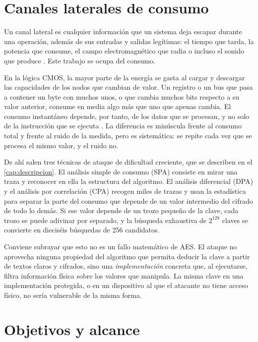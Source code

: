 \section{Canales laterales de consumo}
\label{sec:canales-laterales}

Un canal lateral es cualquier información que un sistema deja escapar durante
una operación, además de sus entradas y salidas legítimas: el tiempo que tarda,
la potencia que consume, el campo electromagnético que radia o incluso el sonido
que produce \cite[sec.~II.B]{mishra2025modern}. Este trabajo se ocupa del
consumo.

En la lógica CMOS, la mayor parte de la energía se gasta al cargar y descargar
las capacidades de los nodos que cambian de valor. Un registro o un bus que pasa
a contener un byte con muchos unos, o que cambia muchos bits respecto a su valor
anterior, consume en media algo más que uno que apenas cambia. El consumo
instantáneo depende, por tanto, de los datos que se procesan, y no solo de la
instrucción que se ejecuta \cite{mangard2007power,kocher2011intro}. La
diferencia es minúscula frente al consumo total y frente al ruido de la medida,
pero es sistemática: se repite cada vez que se procesa el mismo valor, y el
ruido no.

De ahí salen tres técnicas de ataque de dificultad creciente, que se describen
en el \cref{cap:descripcion}. El análisis simple de consumo (SPA) consiste en
mirar una traza y reconocer en ella la estructura del algoritmo. El análisis
diferencial (DPA) \cite{kocher1999dpa} y el análisis por correlación (CPA)
\cite{brier2004cpa} recogen miles de trazas y usan la estadística para separar
la parte del consumo que depende de un valor intermedio del cifrado de todo lo
demás. Si ese valor depende de un trozo pequeño de la clave, cada trozo se puede
adivinar por separado, y la búsqueda exhaustiva de $2^{128}$ claves se convierte
en dieciséis búsquedas de 256 candidatos.

Conviene subrayar que esto no es un fallo matemático de AES. El ataque no
aprovecha ninguna propiedad del algoritmo que permita deducir la clave a partir
de textos claros y cifrados, sino una \emph{implementación} concreta que, al
ejecutarse, filtra información física sobre los valores que manipula. La misma
clave en una implementación protegida, o en un dispositivo al que el atacante no
tiene acceso físico, no sería vulnerable de la misma forma.

\section{Objetivos y alcance}
\label{sec:objetivos}

